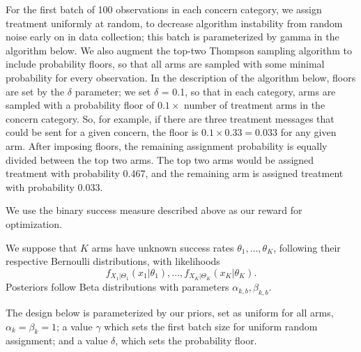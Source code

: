 \documentclass[letterpaper, 12pt, parskip=full,DIV=10]{scrartcl}
\begin{document}
For the first batch of 100 observations in each concern category, we assign treatment uniformly at random, to decrease algorithm instability from random noise early on in data collection; this batch is parameterized by gamma in the algorithm below. We also augment the top-two Thompson sampling algorithm to include probability floors, so that all arms are sampled with some minimal probability for every observation. In the description of the algorithm below, floors are set by the $\delta$ parameter; we set $\delta$ = 0.1, so that in each category, arms are sampled with a probability floor of $0.1 \times$ number of treatment arms in the concern category. So, for example, if there are three treatment messages that could be sent for a given concern, the floor is $0.1\times0.33 = 0.033$ for any given arm. After imposing floors, the remaining assignment probability is equally divided between the top two arms. The top two arms would be assigned treatment with probability 0.467, and the remaining arm is assigned treatment with probability 0.033.

We use the binary success measure described above as our reward for optimization. 


%
%

We suppose that $K$ arms have unknown success rates $\theta_1, \dots, \theta_K$, following their respective Bernoulli distributions, with likelihoods
\[f_{X_1|\Theta_1}(x_1|\theta_1),\dots, f_{X_K|\Theta_K}(x_K|\theta_K).\]
Posteriors follow Beta distributions with parameters $\alpha_{k,b}, \beta_{k,b}$. 

The design below is parameterized by our priors, set as uniform for all arms, $\alpha_{k} = \beta_{k} =1$; a value $\gamma$ which sets the first batch size for uniform random assignment; and a value $\delta$, which sets the probability floor. 
\end{document}
